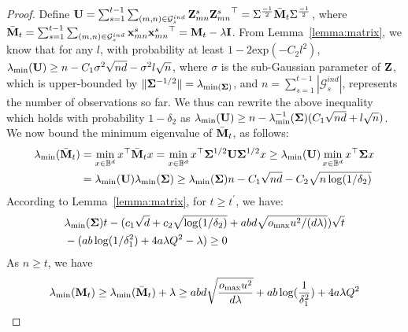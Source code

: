 \begin{proof}
Define $\mathbf{U} = \sum_{s=1}^{t-1}\sum_{(m, n) \in \mathcal{G}_s^{ind}} \mathbf{Z}_{mn}^s{\mathbf{Z}_{mn}^s}^\top = \Sigma^\frac{-1}{2}\bar{\mathbf{M}}_t\Sigma^\frac{-1}{2}$, where $\bar{\mathbf{M}}_t = \sum_{s=1}^{t-1}\sum_{(m, n)  \in \mathcal{G}_s^{ind}}{\mathbf{x}_{mn}^s}{\mathbf{x}_{mn}^s}^\top = \mathbf{M}_t - \lambda\mathbf{I}$. From Lemma~\ref{lemma:matrix}, we know that for any $l$, with probability at least $1 - 2\text{exp}(-C_2l^2)$,
$\lambda_{\text{min}}(\mathbf{U}) \geq n - C_1\sigma^2\sqrt{nd} - \sigma^2l\sqrt{n}$, 
where $\sigma$ is the sub-Gaussian parameter of $\mathbf{Z}$, which is upper-bounded by  $\Vert\mathbf{\Sigma}^{-1/2}\Vert = \lambda_{\text{min}(\mathbf{\Sigma})}$, and $n = \sum_{s=1}^{t-1}|\mathcal{G}_s^{ind}|$, represents the number of observations so far. We thus can rewrite the above inequality which holds with probability $1 - \delta_2$ as
$\lambda_{\text{min}}(\mathbf{U}) \geq n - \lambda_{\text{min}}^{-1}(\mathbf{\Sigma})(C_1\sqrt{nd} + l\sqrt{n})$.
We now bound the minimum eigenvalue of $\bar{\mathbf{M}}_t$, as follows:
\small
\begin{align*}
    \lambda_{\text{min}}(\bar{\mathbf{M}}_t) &= \min_{x\in \mathbb{B}^d}x^\top\bar{\mathbf{M}}_t x = \min_{x\in \mathbb{B}^d}x^\top\mathbf{\Sigma}^{1/2}\mathbf{U}\mathbf{\Sigma}^{1/2}x \geq \lambda_{\text{min}}(\mathbf{U})\min_{x\in \mathbb{B}^d}x^\top \mathbf{\Sigma} x \\
    &= \lambda_{\text{min}}(\mathbf{U})\lambda_{\text{min}}(\mathbf{\Sigma}) \geq \lambda_{\text{min}}(\mathbf{\Sigma})n - C_1\sqrt{nd} - C_2\sqrt{n\log(1/\delta_2)}
\end{align*}
\normalsize
According to Lemma~\ref{lemma:matrix}, for $t \geq t^\prime$, we have:
\small
\begin{align*}
    &\lambda_{\text{min}}(\mathbf{\Sigma})t - (c_1\sqrt{d} + c_2\sqrt{\log({1}/{\delta_2})} + abd\sqrt{{o_{\text{max}}u^2}/({d\lambda})})\sqrt{t} \\
    & - (ab\log({1}/{\delta_1^2}) + 4a\lambda Q^2 - \lambda) \geq 0
\end{align*}
As $n \geq t$, we have
\begin{equation}\label{eq:lambda_min}
    \lambda_{\text{min}}({\mathbf{M}}_t)  \geq  \lambda_{\text{min}}(\bar{\mathbf{M}}_t) + \lambda \geq abd\sqrt{\frac{o_{\text{max}}u^2}{d\lambda}} + ab\log(\frac{1}{\delta_1^2}) + 4a\lambda Q^2
\end{equation}
\normalsize


\end{proof}
